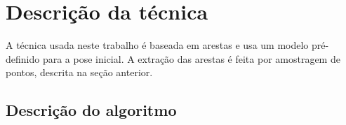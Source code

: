 \chapter{Descrição da técnica}

A técnica usada neste trabalho é baseada em arestas e usa um modelo pré-definido para a pose inicial. A extração das arestas é feita por amostragem de pontos, descrita na seção anterior.

\begin{comment}
\section{Trabalhando com múltiplas hipóteses}

Um dos problemas que ocorrem nas técnicas \emph{edge-based} é que nem sempre se consegue extrair com precisão as arestas da imagem. Na seção anterior foi discutido que um dos passos para a extração das arestas é a procura por pontos de alto gradiente na normal da aresta. Muitas vezes é possível encontrar vários desses pontos para cada amostra, e neste caso obtém-se múltiplas hipóteses de pontos da imagem correspondente ao ponto amostrado. Veja a \figref{cubo_0}.



O trabalho com múltiplas hipóteses foi inicialmente proposto em \cite{multiplas_hipoteses}. Neste trabalho cada aresta $E_i$ (do modelo) projetada na imagem tem um conjunto $\{e_{i,j}\}$ de pontos amostrados. Cada ponto $e_{i,j}$ tem um conjunto $\{e'_{i,j,l}\}$ de hipóteses de correspondência. Em \cite{multiplas_hipoteses} a hipótese $e'_{i,j,l}$ é aquela que tem a menor distância da aresta projetada $E_i$. Então mesmo que sejam encontrados pontos de forte gradiente na normal da aresta $E_i$, aquele que mais se aproxima da aresta projetada é escolhido como correspondente a $e_{i,j}$. Tendo este conjunto de correspondências, o processo continua como no caso de hipótese única.
\end{comment}

\section{Descrição do algoritmo}

